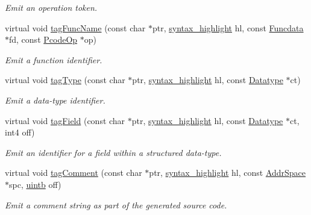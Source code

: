 \begin{DoxyCompactItemize}
\begin{DoxyCompactList}\small\item\em Emit an operation token. \end{DoxyCompactList}\item 
virtual void \mbox{\hyperlink{class_emit_pretty_print_ab9f58bd984c80d9225b0ca2274b6e30d}{tag\+Func\+Name}} (const char $\ast$ptr, \mbox{\hyperlink{class_emit_xml_a7c3577436da429c3c75f4b82cac6864f}{syntax\+\_\+highlight}} hl, const \mbox{\hyperlink{class_funcdata}{Funcdata}} $\ast$fd, const \mbox{\hyperlink{class_pcode_op}{Pcode\+Op}} $\ast$op)
\begin{DoxyCompactList}\small\item\em Emit a function identifier. \end{DoxyCompactList}\item 
virtual void \mbox{\hyperlink{class_emit_pretty_print_ab32d0377009a58ce103fb1481927d315}{tag\+Type}} (const char $\ast$ptr, \mbox{\hyperlink{class_emit_xml_a7c3577436da429c3c75f4b82cac6864f}{syntax\+\_\+highlight}} hl, const \mbox{\hyperlink{class_datatype}{Datatype}} $\ast$ct)
\begin{DoxyCompactList}\small\item\em Emit a data-\/type identifier. \end{DoxyCompactList}\item 
virtual void \mbox{\hyperlink{class_emit_pretty_print_a5876b8de594c02635fbb0df518a38961}{tag\+Field}} (const char $\ast$ptr, \mbox{\hyperlink{class_emit_xml_a7c3577436da429c3c75f4b82cac6864f}{syntax\+\_\+highlight}} hl, const \mbox{\hyperlink{class_datatype}{Datatype}} $\ast$ct, int4 off)
\begin{DoxyCompactList}\small\item\em Emit an identifier for a field within a structured data-\/type. \end{DoxyCompactList}\item 
virtual void \mbox{\hyperlink{class_emit_pretty_print_a0ae1494cdfa4fdf65eb8dbeea3a5e19a}{tag\+Comment}} (const char $\ast$ptr, \mbox{\hyperlink{class_emit_xml_a7c3577436da429c3c75f4b82cac6864f}{syntax\+\_\+highlight}} hl, const \mbox{\hyperlink{class_addr_space}{Addr\+Space}} $\ast$spc, \mbox{\hyperlink{types_8h_a2db313c5d32a12b01d26ac9b3bca178f}{uintb}} off)
\begin{DoxyCompactList}\small\item\em Emit a comment string as part of the generated source code. \end{DoxyCompactList}\item 

\end{DoxyCompactItemize}

